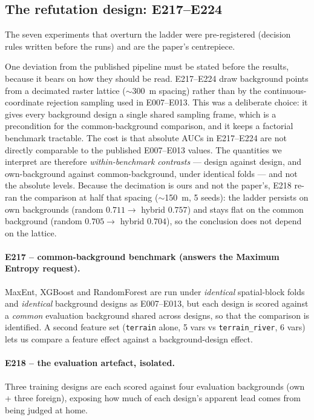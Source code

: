 \documentclass[12pt]{article}
\begin{document}
\subsection{The refutation design: E217--E224}
\label{sec:refutation}

The seven experiments that overturn the ladder were pre-registered (decision rules written before the runs) and are the paper's centrepiece.

One deviation from the published pipeline must be stated before the results, because it bears on how they should be read.
E217--E224 draw background points from a decimated raster lattice ($\sim$300~m spacing) rather than by the continuous-coordinate rejection sampling used in E007--E013.
This was a deliberate choice: it gives every background design a single shared sampling frame, which is a precondition for the common-background comparison, and it keeps a factorial benchmark tractable.
The cost is that absolute AUCs in E217--E224 are not directly comparable to the published E007--E013 values.
The quantities we interpret are therefore \emph{within-benchmark contrasts} --- design against design, and own-background against common-background, under identical folds --- and not the absolute levels.
Because the decimation is ours and not the paper's, E218 re-ran the comparison at half that spacing ($\sim$150~m, 5 seeds): the ladder persists on own backgrounds (random $0.711 \rightarrow$ hybrid $0.757$) and stays flat on the common background (random $0.705 \rightarrow$ hybrid $0.704$), so the conclusion does not depend on the lattice.

\paragraph{E217 -- common-background benchmark (answers the Maximum Entropy request).}
MaxEnt, XGBoost and RandomForest are run under \emph{identical} spatial-block folds and \emph{identical} background designs as E007--E013, but each design is scored against a \emph{common} evaluation background shared across designs, so that the comparison is identified.
A second feature set (\texttt{terrain} alone, 5 vars vs \texttt{terrain\_river}, 6 vars) lets us compare a feature effect against a background-design effect.

\paragraph{E218 -- the evaluation artefact, isolated.}
Three training designs are each scored against four evaluation backgrounds (own + three foreign), exposing how much of each design's apparent lead comes from being judged at home.
\end{document}
